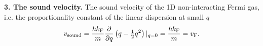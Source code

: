 \textbf{3.  The sound velocity.} 
The sound velocity of the 1D non-interacting Fermi gas, i.e. the proportionality constant of the linear dispersion at small $q$
\begin{equation*}
	v_{\textnormal{sound}} = \frac{ \hbar k_{\textnormal{F}}}{m}\frac{\partial }{\partial q} \left(q - \tfrac{1}{2} q^2\right) |_{q = 0} = \frac{\hbar k_{\textnormal{F}}}{m} = v_{\textnormal{F}}.
\end{equation*}


